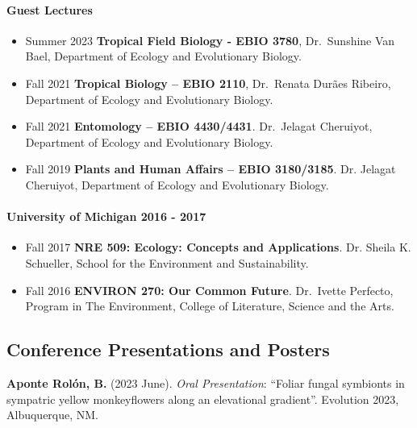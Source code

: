 \documentclass[
  letterpaper,
  DIV=11,
  numbers=noendperiod]{scrartcl}
\let\oldparagraph\paragraph
\renewcommand{\paragraph}[1]{\oldparagraph{#1}\mbox{}}
\begin{document}
\paragraph{Guest Lectures}\label{guest-lectures}

\begin{itemize}
\item
  Summer 2023 \textbar{} \textbf{Tropical Field Biology - EBIO 3780},
  Dr.~Sunshine Van Bael, Department of Ecology and Evolutionary Biology.
\item
  Fall 2021 \textbar{} \textbf{Tropical Biology -- EBIO 2110},
  Dr.~Renata Durães Ribeiro, Department of Ecology and Evolutionary
  Biology.
\item
  Fall 2021 \textbar{} \textbf{Entomology -- EBIO 4430/4431}.
  Dr.~Jelagat Cheruiyot, Department of Ecology and Evolutionary Biology.
\item
  Fall 2019 \textbar{} \textbf{Plants and Human Affairs -- EBIO
  3180/3185}. Dr. Jelagat Cheruiyot, Department of Ecology and
  Evolutionary Biology.
\end{itemize}

\paragraph{\texorpdfstring{University of Michigan {2016 -
2017}}{University of Michigan 2016 - 2017}}\label{university-of-michigan-2016---2017}

\begin{itemize}
\item
  Fall 2017 \textbar{} \textbf{NRE 509: Ecology: Concepts and
  Applications}. Dr. Sheila K. Schueller, School for the Environment and
  Sustainability.
\item
  Fall 2016 \textbar{} \textbf{ENVIRON 270: Our Common Future}.
  Dr.~Ivette Perfecto, Program in The Environment, College of
  Literature, Science and the Arts.\\
\end{itemize}

\subsection{\texorpdfstring{ Conference
Presentations and
Posters}{ Conference Presentations and Posters}}\label{conference-presentations-and-posters}

\textbf{Aponte Rolón, B.} (2023 June). \emph{Oral Presentation}:
``Foliar fungal symbionts in sympatric yellow monkeyflowers along an
elevational gradient''. Evolution 2023, Albuquerque, NM.
\end{document}
